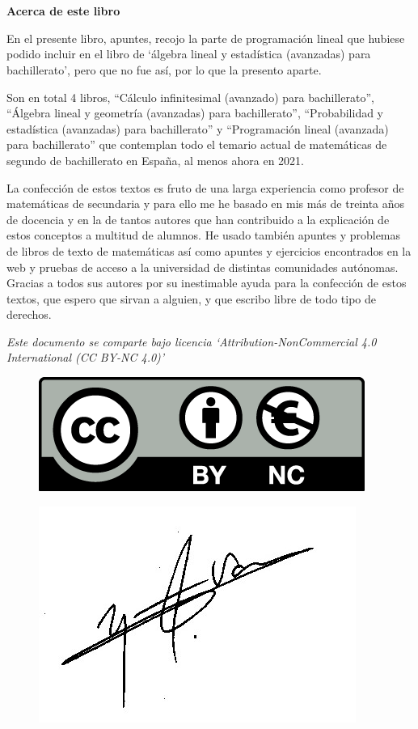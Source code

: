 \chapter*{}


\Large{\textbf{Acerca de este libro}}

\normalsize{En} el presente libro, apuntes, recojo  la parte de programación lineal que hubiese podido incluir en el libro de `álgebra lineal y estadística (avanzadas) para bachillerato', pero que no fue así, por lo que la presento aparte. 

Son en total 4 libros, ``Cálculo infinitesimal (avanzado) para bachillerato'',  ``Álgebra lineal y geometría (avanzadas) para bachillerato'', ``Probabilidad y estadística (avanzadas) para bachillerato'' y ``Programación lineal (avanzada) para bachillerato'' que contemplan todo el temario actual de matemáticas de segundo de bachillerato en España, al menos ahora en 2021.


La confección de estos textos es fruto de una larga experiencia como profesor de matemáticas de secundaria y para ello me he basado en mis más de treinta años de docencia  y en la de tantos autores que han contribuido a la explicación de estos conceptos a multitud de alumnos. He usado también apuntes y problemas de libros de texto de matemáticas así como apuntes y ejercicios encontrados en la web y pruebas de acceso a la universidad de distintas comunidades autónomas. Gracias a todos sus autores por su inestimable ayuda para la confección de estos textos, que espero que sirvan a alguien, y que escribo libre de todo tipo de derechos. 


\vspace{5mm}
\justify

\emph{Este documento se comparte bajo licencia `Attribution-NonCommercial 4.0 International (CC BY-NC 4.0)'}


\begin{multicols}{2}
\begin{figure}[H]
	\centering
	\includegraphics[width=.4
	\textwidth]{imagenes/licencia.png}
	
\end{figure}
\begin{figure}[H]
	\centering
	\includegraphics[width=.3
	\textwidth]{imagenes/firma.png}
\end{figure}
\end{multicols}

